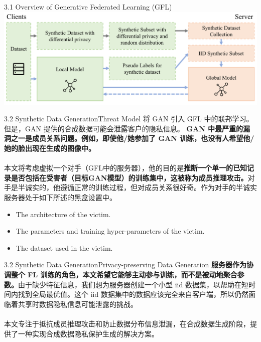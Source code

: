 \documentclass{sintefbeamer}
\theoremstyle{definition}
\begin{document}
\begin{frame}{3.1  Overview of Generative Federated Learning (GFL)}
\centering
\includegraphics[width=1\textwidth]{images/gfl_overview}

\end{frame}

	
\begin{frame}{3.2 Synthetic Data Generation}{Threat Model}
	将 GAN 引入 GFL 中的联邦学习。但是，GAN 提供的合成数据可能会泄露客户的隐私信息。 \textbf{GAN 中最严重的漏洞之一是成员关系问题。例如，即使他/她参加了 GAN 训练，也没有人希望他/她的脸出现在生成的图像中。}
		\\ \hspace*{\fill} \\
	本文将考虑虚拟一个对手（GFL中的服务器），他的目的是\textbf{推断一个单一的已知记录是否包括在受害者（目标GAN模型）的训练集中，这被称为成员推理攻击。}对手是半诚实的，他遵循正常的训练过程，但对成员关系很好奇。作为对手的半诚实服务器处于如下所述的黑盒设置中。

\begin{itemize}
\item The architecture of the victim.
\item The parameters and training hyper-parameters of the victim.
\item The dataset used in the victim.
\end{itemize}

\end{frame}

\begin{frame}{3.2 Synthetic Data Generation}{Privacy-preserving Data Generation}
\textbf{服务器作为协调整个 FL 训练的角色，本文希望它能够主动参与训练，而不是被动地聚合参数。}由于缺少特征信息，我们想为服务器创建一个小型 iid 数据集，以帮助在短时间内找到全局最优值。这个 iid 数据集中的数据应该完全来自客户端，所以仍然面临着共享时数据隐私信息可能泄露的挑战。
\\ \hspace*{\fill} \\
本文专注于抵抗成员推理攻击和防止数据分布信息泄漏，在合成数据生成阶段，提供了一种实现合成数据隐私保护生成的解决方案。


\end{frame}
\end{document}
